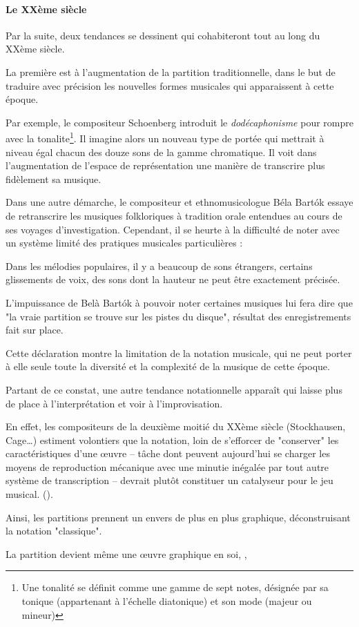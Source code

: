 
\paragraph{Le XXème siècle} Par la suite, deux tendances se dessinent qui cohabiteront tout au long du XXème siècle. 

La première est à l'augmentation de la partition traditionnelle, dans le but de traduire avec précision les nouvelles formes musicales qui apparaissent à cette époque.

Par exemple, le compositeur Schoenberg introduit le \textit{dodécaphonisme} pour rompre avec la \gls{tonalite}\footnote{Une tonalité se définit comme une gamme de sept notes, désignée par sa tonique (appartenant à l'échelle diatonique) et son mode (majeur ou mineur)}. Il imagine alors un nouveau type de portée qui mettrait à niveau égal chacun des douze sons de la gamme chromatique. Il voit dans l'augmentation de l'espace de représentation une manière de transcrire plus fidèlement sa musique.

Dans une autre démarche, le compositeur et ethnomusicologue Béla Bart\'{o}k essaye de retranscrire les musiques folkloriques à tradition orale entendues au cours de ses voyages d'investigation.
Cependant, il se heurte à la difficulté de noter avec un système limité des pratiques musicales particulières :

\begin{displayquote}
\og Dans les mélodies populaires, il y a beaucoup de sons étrangers, certains glissements de voix, des sons dont la hauteur ne peut être exactement précisée.\fg 
\end{displayquote}


L'impuissance de Belà Bart\'{o}k à pouvoir noter certaines musiques lui fera dire que "la vraie partition se trouve sur les pistes du disque", résultat des enregistrements fait sur place.

Cette déclaration montre la limitation de la notation musicale, qui ne peut porter à elle seule toute la diversité et la complexité de la musique de cette époque.

Partant de ce constat, une autre tendance notationnelle apparaît qui laisse plus de place à l'interprétation et voir à l'improvisation. 

En effet, les compositeurs de la deuxième moitié du XXème siècle (Stockhausen, Cage…) \og estiment volontiers que la notation, loin de s'efforcer de "conserver" les caractéristiques d'une œuvre -- tâche dont peuvent aujourd'hui se charger les moyens de reproduction mécanique avec une minutie inégalée par tout autre système de transcription -- devrait plutôt constituer un catalyseur pour le jeu musical. \fg (\cite[115]{bosseur2005}).

Ainsi, les partitions prennent un envers de plus en plus graphique, déconstruisant la notation "classique". 

La partition devient même une œuvre graphique en soi, ,  

